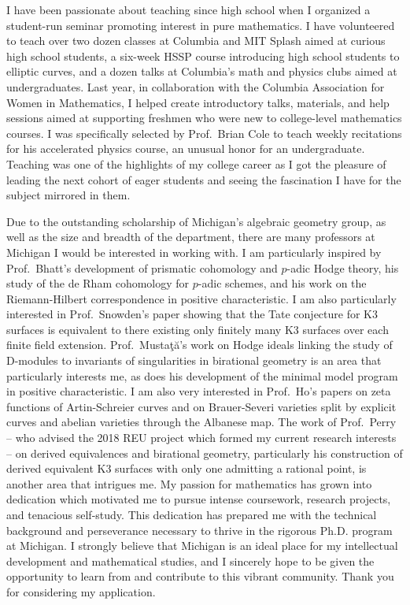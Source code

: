 \documentclass[11pt]{article}
\begin{document}
I have been passionate about teaching since high school when I organized a student-run seminar promoting interest in pure mathematics. I have volunteered to teach over two dozen classes at Columbia and MIT Splash aimed at curious high school students, a six-week HSSP course introducing high school students to elliptic curves, and a dozen talks at Columbia's math and physics clubs aimed at undergraduates. Last year, in collaboration with the Columbia Association for Women in Mathematics, I helped create introductory talks, materials, and help sessions aimed at supporting freshmen who were new to college-level mathematics courses. I was specifically selected by Prof.\ Brian Cole to teach weekly recitations for his accelerated physics course, an unusual honor for an undergraduate. Teaching was one of the highlights of my college career as I got the pleasure of leading the next cohort of eager students and seeing the fascination I have for the subject mirrored in them.
\par
Due to the outstanding scholarship of Michigan’s algebraic geometry group, as well as the size and breadth of the department, there are many professors at Michigan I would be interested in working with. I am particularly inspired by Prof.\ Bhatt’s development of prismatic cohomology and $p$-adic Hodge theory, his study of the de Rham cohomology for $p$-adic schemes, and his work on the Riemann-Hilbert correspondence in positive characteristic. I am also particularly interested in Prof.\ Snowden’s paper showing that the Tate conjecture for K3 surfaces is equivalent to there existing only finitely many K3 surfaces over each finite field extension. Prof.\ Mustaţă’s work on Hodge ideals linking the study of D-modules to invariants of singularities in birational geometry is an area that particularly interests me, as does his development of the minimal model program in positive characteristic. I am also very interested in Prof.\ Ho’s papers on zeta functions of Artin-Schreier curves and on Brauer-Severi varieties split by explicit curves and abelian varieties through the Albanese map. The work of Prof.\ Perry – who advised the 2018 REU project which formed my current research interests – on derived equivalences and birational geometry, particularly his construction of derived equivalent K3 surfaces with only one admitting a rational point, is another area that intrigues me. My passion for mathematics has grown into dedication which motivated me to pursue intense coursework, research projects, and tenacious self-study. This dedication has prepared me with the technical background and perseverance necessary to thrive in the rigorous Ph.D. program at Michigan. I strongly believe that Michigan is an ideal place for my intellectual development and mathematical studies, and I sincerely hope to be given the opportunity to learn from and contribute to this vibrant community. Thank you for considering my application. 
\end{document}
